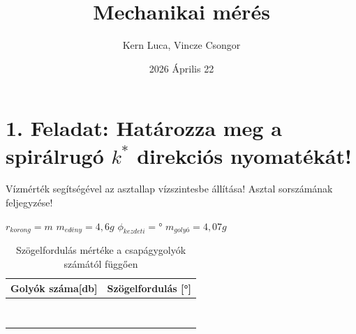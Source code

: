 \documentclass{article}
\title{Mechanikai mérés}
\author{Kern Luca, Vincze Csongor}
\date{2026 Április 22}
\begin{document}
\maketitle

\section*{1. Feladat: Határozza meg a spirálrugó $k^*$ direkciós nyomatékát!}

Vízmérték segítségével az asztallap vízszintesbe állítása!
Asztal sorszámának feljegyzése!

$r_{korong}= m$
$m_{edény}=4,6 g$
$\phi_{kezdeti}= °$
$m_{golyó}=4,07 g$

\begin{table}[H]
    \centering
    \begin{tabular}{|c|c|}
        \hline
        Golyók száma[db] & Szögelfordulás [°] \\ \hline
         & \\ \hline 
         & \\ \hline
         & \\ \hline 
         & \\ \hline
         & \\ \hline 
         & \\ \hline
         & \\ \hline 
         & \\ \hline
        
    \end{tabular}
    \caption{Szögelfordulás mértéke a csapágygolyók számától függően}
    \label{tab:szogelfordulas}
\end{table}
\end{document}
